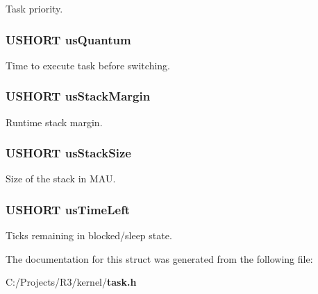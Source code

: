 Task priority. 
\subsubsection[{usQuantum}]{\setlength{\rightskip}{0pt plus 5cm}USHORT {\bf usQuantum}}\label{struct_task___struct_a43887fe18e259eb9247154093dd8cfd0}


Time to execute task before switching. 
\subsubsection[{usStackMargin}]{\setlength{\rightskip}{0pt plus 5cm}USHORT {\bf usStackMargin}}\label{struct_task___struct_a07eb1c1f81ab6c5607c33c4c2620c09e}


Runtime stack margin. 
\subsubsection[{usStackSize}]{\setlength{\rightskip}{0pt plus 5cm}USHORT {\bf usStackSize}}\label{struct_task___struct_a6a09c83344444fed49be0f978ec54cf2}


Size of the stack in MAU. 
\subsubsection[{usTimeLeft}]{\setlength{\rightskip}{0pt plus 5cm}USHORT {\bf usTimeLeft}}\label{struct_task___struct_a35f8db07542bcde135d549ceb9fddc05}


Ticks remaining in blocked/sleep state. 

The documentation for this struct was generated from the following file:\begin{DoxyCompactItemize}
\item 
C:/Projects/R3/kernel/{\bf task.h}\end{DoxyCompactItemize}

